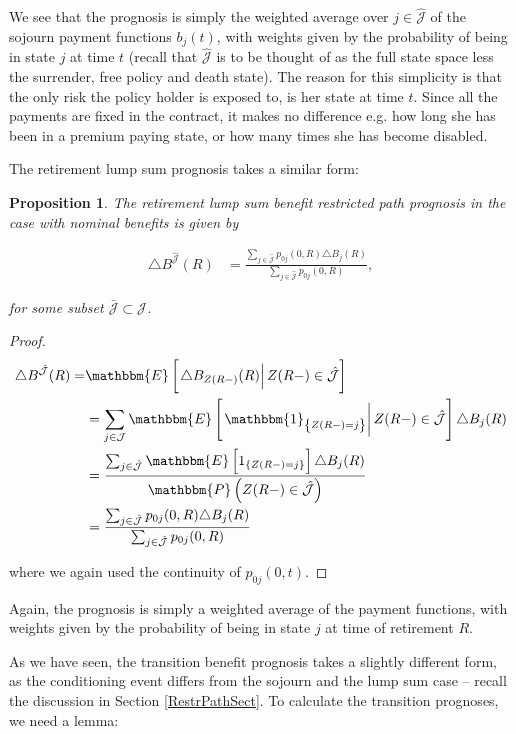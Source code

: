 \documentclass{article}
\newcommand{\1}[1]{\mathbbm{1}_{\left\lbrace #1 \right\rbrace}}
\newcommand{\expec}[1][def]{\mathbbm{E} \left[ #1 \right]}
\newcommand{\econd}[2][def]{\mathbbm{E} \left[ \left. #1 \right| #2 \right]}
\newcommand{\probability}[1][def]{\mathbbm{P} \left( #1 \right)}
\theoremstyle{break}
\newtheorem{proposition}[definition]{Proposition}%
\theoremstyle{remark}
\numberwithin{equation}{section}
\begin{document}
We see that the prognosis is simply the weighted average over $j \in \hat{\mathcal{J}}$ of the sojourn payment functions $b_j(t)$, with weights given by the probability of being in state $j$ at time $t$ (recall that $\hat{\mathcal{J}}$ is to be thought of as the full state space less the surrender, free policy and death state). The reason for this simplicity is that the only risk the policy holder is exposed to, is her state at time $t$. Since all the payments are fixed in the contract, it makes no difference e.g. how long she has been in a premium paying state, or how many times she has become disabled.

The retirement lump sum prognosis takes a similar form:

\begin{proposition} \label{RetireWithoutBonus}
The retirement lump sum benefit restricted path prognosis in the case with nominal benefits is given by

\begin{align*}
    \triangle B^{\hat{\mathcal{J}}}(R) &= \frac{\sum_{j \in \hat{\mathcal{J}}} p_{0j}(0,R) \triangle B_j(R)}{\sum_{j \in \hat{\mathcal{J}}} p_{0j}(0,R)},
\end{align*}

for some subset $\bar{\mathcal{J}} \subset \mathcal{J}$.
\end{proposition}

\begin{proof}
\begin{align*}
	\triangle B^{\hat{\mathcal{J}}}(R) =& \econd[\triangle B_{Z(R-)}(R)]{Z(R-) \in \hat{\mathcal{J}}} \\
	&= \sum_{j \in \mathcal{J}} \econd[\1{Z(R-)=j}]{Z(R-) \in \hat{\mathcal{J}}} \triangle B_j(R) \\
	&= \frac{\sum_{j \in \hat{\mathcal{J}}} \expec[ 1_{\{Z(R-)=j\}} ] \triangle B_j(R)}{\probability[Z(R-) \in \hat{\mathcal{J}}]} \\
	&= \frac{\sum_{j \in \hat{\mathcal{J}}} p_{0j}(0,R) \triangle B_j(R)}{\sum_{j \in \hat{\mathcal{J}}} p_{0j}(0,R)}
\end{align*}

where we again used the continuity of $p_{0j}(0,t)$.
\end{proof}

Again, the prognosis is simply a weighted average of the payment functions, with weights given by the probability of being in state $j$ at time of retirement $R$.

As we have seen, the transition benefit prognosis takes a slightly different form, as the conditioning event differs from the sojourn and the lump sum case -- recall the discussion in Section \ref{RestrPathSect}. To calculate the transition prognoses, we need a lemma:
\end{document}
